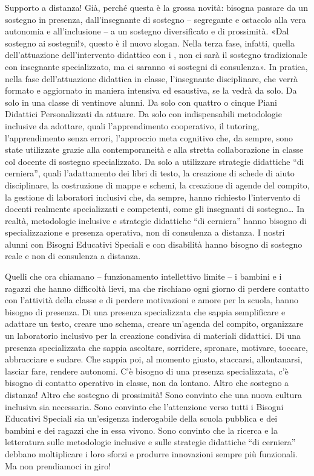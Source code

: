 Supporto a distanza! Già, perché questa è la grossa novità: bisogna passare da un sostegno in presenza, dall'insegnante di sostegno – segregante e ostacolo alla vera autonomia e all'inclusione – a un sostegno diversificato e di prossimità. «Dal sostegno ai sostegni!», questo è il nuovo slogan. Nella terza fase, infatti, quella dell'attuazione dell'intervento didattico con i , non ci sarà il sostegno tradizionale con insegnante specializzato, ma ci saranno «i sostegni di consulenza». In pratica, nella fase dell'attuazione didattica in classe, l'insegnante disciplinare, che verrà formato e aggiornato in maniera intensiva ed esaustiva, se la vedrà da solo. Da solo in una classe di ventinove alunni. Da solo con quattro o cinque Piani Didattici Personalizzati da attuare. Da solo con indispensabili metodologie inclusive da adottare, quali l'apprendimento cooperativo, il tutoring, l'apprendimento senza errori, l'approccio meta cognitivo che, da sempre, sono state utilizzate grazie alla contemporaneità e alla stretta collaborazione in classe col docente di sostegno specializzato. Da solo a utilizzare strategie didattiche “di cerniera”, quali l'adattamento dei libri di testo, la creazione di schede di aiuto disciplinare, la costruzione di mappe e schemi, la creazione di agende del compito, la gestione di laboratori inclusivi che, da sempre, hanno richiesto l'intervento di docenti realmente specializzati e competenti, come gli insegnanti di sostegno\dots
In realtà, metodologie inclusive e strategie didattiche “di cerniera” hanno bisogno di specializzazione e presenza operativa, non di consulenza a distanza. I nostri alunni con Bisogni Educativi Speciali e con disabilità hanno bisogno di sostegno reale e non di consulenza a distanza.

Quelli che ora chiamano  – funzionamento intellettivo limite – i bambini e i ragazzi che hanno difficoltà lievi, ma che rischiano ogni giorno di perdere contatto con l'attività della classe e di perdere motivazioni e amore per la scuola, hanno bisogno di presenza. Di una presenza specializzata che sappia semplificare e adattare un testo, creare uno schema, creare un'agenda del compito, organizzare un laboratorio inclusivo per la creazione condivisa di materiali didattici. Di una presenza specializzata che sappia ascoltare, sorridere, spronare, motivare, toccare, abbracciare e sudare. Che sappia poi, al momento giusto, staccarsi, allontanarsi, lasciar fare, rendere autonomi. C'è bisogno di una presenza specializzata, c'è bisogno di contatto operativo in classe, non da lontano. Altro che sostegno a distanza! Altro che sostegno di prossimità!
Sono convinto che una nuova cultura inclusiva sia necessaria. Sono convinto che l'attenzione verso tutti i Bisogni Educativi Speciali sia un'esigenza inderogabile della scuola pubblica e dei bambini e dei ragazzi che in essa vivono. Sono convinto che la ricerca e la letteratura sulle metodologie inclusive e sulle strategie didattiche “di cerniera” debbano moltiplicare i loro sforzi e produrre innovazioni sempre più funzionali. Ma non prendiamoci in giro!

